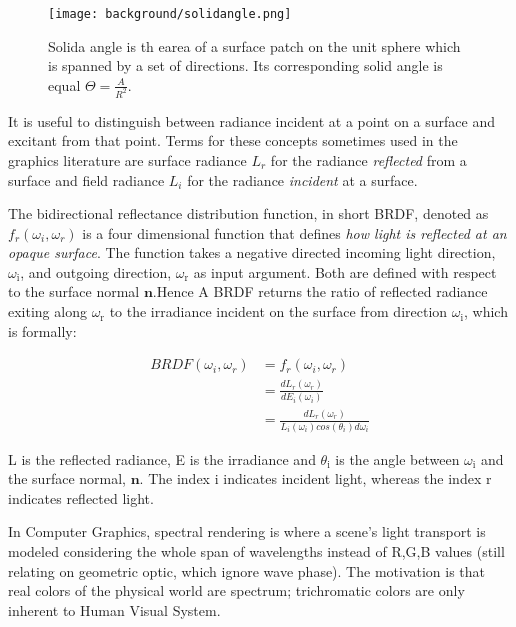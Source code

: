 \begin{figure}[H]
  \centering
  \texttt{[image: background/solidangle.png]}
  \caption{Solida angle is th earea of a surface patch on the unit sphere which is spanned by a set of directions. Its corresponding solid angle is equal $\Theta = \frac{A}{R^2}$.}
  \label{fig:solidangle}
\end{figure}

It is useful to distinguish between radiance incident at a point on a surface and excitant from that point. Terms for these concepts sometimes used in the graphics literature are surface radiance $L_r$ for the radiance \textit{reflected} from a surface and field radiance $L_i$ for the radiance \textit{incident} at a surface.  

\label{brdf}
The bidirectional reflectance distribution function, in short BRDF, denoted as $f_r(\omega_i, \omega_r)$ is a four dimensional function that defines \textit{how light is reflected at an opaque surface}. The function takes a negative directed incoming light direction, $\omega_{\text{i}}$, and outgoing direction, $\omega_{\text{r}}$ as input argument. Both are defined with respect to the surface normal $\mathbf{n}$.Hence A BRDF returns the ratio of reflected radiance exiting along $\omega_{\text{r}}$ to the irradiance incident on the surface from direction $\omega_{\text{i}}$, which is formally:
  
\begin{align}
  BRDF(\omega_i, \omega_r)
  & = f_r(\omega_i, \omega_r) \nonumber \\
  & = \frac{dL_r(\omega_r)}{dE_i(\omega_i)} \nonumber \\
  & = \frac{dL_r(\omega_r)}{L_i(\omega_i)cos(\theta_i)d\omega_i}
  \label{eq:defbrdf}
\end{align}

L is the reflected radiance, E is the irradiance and $\theta_{\text{i}}$ is the angle between $\omega_{\text{i}}$ and the surface normal, $\mathbf n$. The index $\text{i}$ indicates incident light, whereas the index $\text{r}$ indicates reflected light.

In Computer Graphics, spectral rendering is where a scene's light transport is modeled considering the whole span of wavelengths instead of R,G,B values (still relating on geometric optic, which ignore wave phase). The motivation is that real colors of the physical world are spectrum; trichromatic colors are only inherent to Human Visual System.

